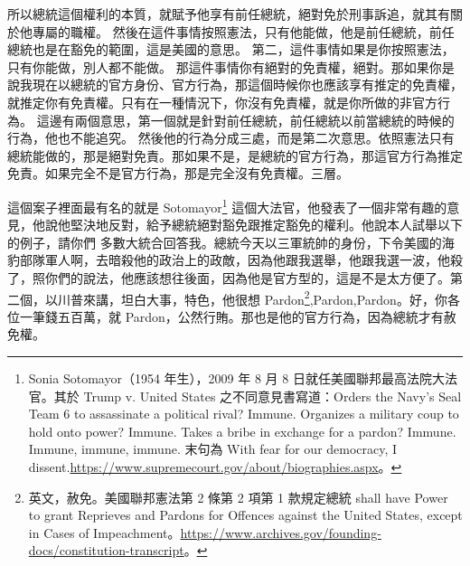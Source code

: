 \hypertarget{c11:cue:148}{}所以總統這個權利的本質，就賦予他享有前任總統，絕對免於刑事訴追，就其有關於他專屬的職權。
\hypertarget{c11:cue:149}{}然後在這件事情按照憲法，只有他能做，他是前任總統，前任總統也是在豁免的範圍，這是美國的意思。
\hypertarget{c11:cue:150}{}第二，這件事情如果是你按照憲法，只有你能做，別人都不能做。
\hypertarget{c11:cue:151}{}那這件事情你有絕對的免責權，絕對。那如果你是說我現在以總統的官方身份、官方行為，那這個時候你也應該享有推定的免責權，就推定你有免責權。只有在一種情況下，你沒有免責權，就是你所做的非官方行為。
\hypertarget{c11:cue:152}{}這邊有兩個意思，第一個就是針對前任總統，前任總統以前當總統的時候的行為，他也不能追究。
\hypertarget{c11:cue:153}{}然後他的行為分成三處，而是第二次意思。依照憲法只有總統能做的，那是絕對免責。那如果不是，是總統的官方行為，那這官方行為推定免責。如果完全不是官方行為，那是完全沒有免責權。三層。

\hypertarget{c11:cue:154}{}這個案子裡面最有名的就是 Sotomayor\footnote{Sonia Sotomayor（1954 年生），2009 年 8 月 8 日就任美國聯邦最高法院大法官。其於 Trump v. United States 之不同意見書寫道：Orders the Navy’s Seal Team 6 to assassinate a political rival? Immune. Organizes a military coup to hold onto power? Immune. Takes a bribe in exchange for a pardon? Immune. Immune, immune, immune. 末句為 With fear for our democracy, I dissent.\url{https://www.supremecourt.gov/about/biographies.aspx}。} 這個大法官，他發表了一個非常有趣的意見，他說他堅決地反對，給予總統絕對豁免跟推定豁免的權利。他說本人試舉以下的例子，請你們
\hypertarget{c11:cue:155}{}多數大統合回答我。總統今天以三軍統帥的身份，下令美國的海豹部隊軍人啊，去暗殺他的政治上的政敵，因為他跟我選舉，他跟我選一波，他殺了，照你們的說法，他應該想往後面，因為他是官方型的，這是不是太方便了。第二個，以川普來講，坦白大事，特色，他很想 Pardon\footnote{英文，赦免。美國聯邦憲法第 2 條第 2 項第 1 款規定總統 shall have Power to grant Reprieves and Pardons for Offences against the United States, except in Cases of Impeachment。\url{https://www.archives.gov/founding-docs/constitution-transcript}。},Pardon,Pardon。好，你各位一筆錢五百萬，就 Pardon，公然行賄。那也是他的官方行為，因為總統才有赦免權。

